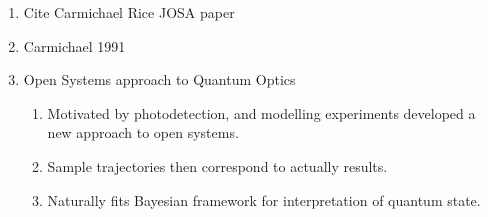 \begin{enumerate}
\item Cite Carmichael Rice JOSA paper~\cite{Carmichael1989}
\item Carmichael 1991 ~\cite{Carmichael1991}
\item Open Systems approach to Quantum Optics\cite{Carmichael1993}
\begin{enumerate}
  \item Motivated by photodetection, and modelling experiments developed a new approach to open systems.  
  \item Sample trajectories then correspond to actually results.
  \item Naturally fits Bayesian framework for interpretation of quantum state.  
\end{enumerate}


\end{enumerate}
